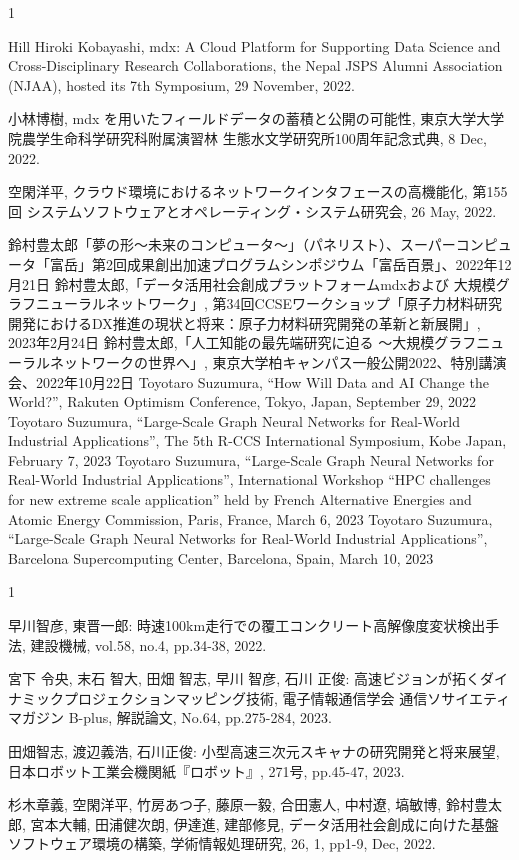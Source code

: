\begin{招待講演}{1}

Hill Hiroki Kobayashi, mdx: A Cloud Platform for Supporting Data Science and Cross-Disciplinary Research Collaborations, the Nepal JSPS Alumni Association (NJAA), hosted its 7th Symposium, 29 November, 2022.

小林博樹, mdx を用いたフィールドデータの蓄積と公開の可能性, 東京大学大学院農学生命科学研究科附属演習林 生態水文学研究所100周年記念式典, 8 Dec, 2022.

空閑洋平, クラウド環境におけるネットワークインタフェースの高機能化, 第155回 システムソフトウェアとオペレーティング・システム研究会, 26 May, 2022.


 鈴村豊太郎「夢の形～未来のコンピュータ～」（パネリスト）、スーパーコンピュータ「富岳」第2回成果創出加速プログラムシンポジウム「富岳百景」、2022年12月21日
鈴村豊太郎,「データ活用社会創成プラットフォームmdxおよび 大規模グラフニューラルネットワーク」, 第34回CCSEワークショップ「原子力材料研究開発におけるDX推進の現状と将来：原子力材料研究開発の革新と新展開」, 2023年2月24日
鈴村豊太郎,「人工知能の最先端研究に迫る ～大規模グラフニューラルネットワークの世界へ」, 東京大学柏キャンパス一般公開2022、特別講演会、2022年10月22日
Toyotaro Suzumura, “How Will Data and AI Change the World?”,  Rakuten Optimism Conference, Tokyo, Japan, September 29, 2022
Toyotaro Suzumura,  “Large-Scale Graph Neural Networks for Real-World Industrial Applications”, The 5th R-CCS International Symposium, Kobe Japan, February 7, 2023
Toyotaro Suzumura,  “Large-Scale Graph Neural Networks for Real-World Industrial Applications”, International Workshop “HPC challenges for new extreme scale application” held by French Alternative Energies and Atomic Energy Commission, Paris, France, March 6, 2023
Toyotaro Suzumura,  “Large-Scale Graph Neural Networks for Real-World Industrial Applications”, Barcelona Supercomputing Center, Barcelona, Spain, March 10, 2023
\end{招待講演}

\begin{招待論文}{1}


早川智彦, 東晋一郎: 時速100km走行での覆工コンクリート高解像度変状検出手法, 建設機械, vol.58, no.4, pp.34-38, 2022.


宮下 令央, 末石 智大, 田畑 智志, 早川 智彦, 石川 正俊: 高速ビジョンが拓くダイナミックプロジェクションマッピング技術, 電子情報通信学会 通信ソサイエティマガジン B-plus, 解説論文, No.64, pp.275-284, 2023. 


田畑智志, 渡辺義浩, 石川正俊: 小型高速三次元スキャナの研究開発と将来展望, 日本ロボット工業会機関紙『ロボット』, 271号, pp.45-47, 2023.

杉木章義, 空閑洋平, 竹房あつ子, 藤原一毅, 合田憲人, 中村遼, 塙敏博, 鈴村豊太郎, 宮本大輔, 田浦健次朗, 伊達進, 建部修見, データ活用社会創成に向けた基盤ソフトウェア環境の構築, 学術情報処理研究, 26, 1, pp1-9, Dec, 2022.


\end{招待論文}


